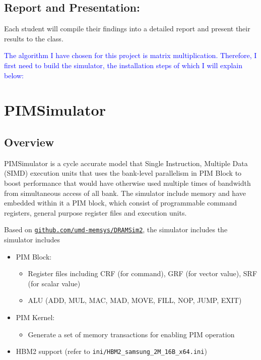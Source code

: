 \documentclass[12pt]{article}
\begin{document}
\subsection{Report and Presentation:}
Each student will compile their findings into a detailed report and present their results to the class.




\textcolor{blue}{The algorithm I have chosen for this project is matrix multiplication. Therefore, I first need to build the simulator, the installation steps of which I will explain below:}


\section{PIMSimulator}
\subsection{Overview}
PIMSimulator is a cycle accurate model that Single Instruction, Multiple Data (SIMD) execution units that uses the bank-level parallelism in PIM Block to boost performance that would have otherwise used multiple times of bandwidth from simultaneous access of all bank. The simulator include memory and have embedded within it a PIM block, which consist of programmable command registers, general purpose register files and execution units.

Based on \href{https://github.com/umd-memsys/DRAMSim2}{\texttt{github.com/umd-memsys/DRAMSim2}}, the simulator includes the simulator includes

\begin{itemize}
	\item PIM Block:
	\begin{itemize}
		\item Register files including CRF (for command), GRF (for vector value), SRF (for scalar value)
		\item ALU (ADD, MUL, MAC, MAD, MOVE, FILL, NOP, JUMP, EXIT)
	\end{itemize}
	
	
	\item PIM Kernel:
	\begin{itemize}
		\item 
		Generate a set of memory transactions for enabling PIM operation
	\end{itemize}
	\item HBM2 support (refer to \texttt{ini/HBM2\_samsung\_2M\_16B\_x64.ini})
\end{itemize}
\end{document}
